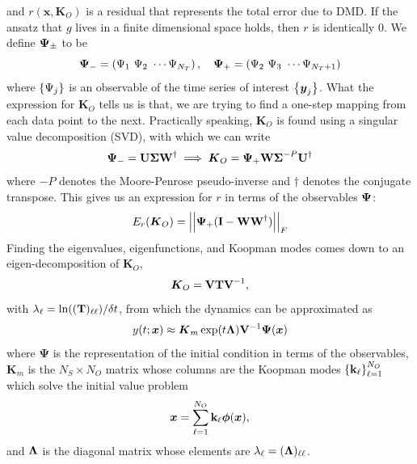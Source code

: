 and $r(\boldsymbol{x}, \boldsymbol{K}_O)$ is a residual that represents the 
total error due to DMD. If the ansatz that $g$ lives in a finite dimensional space holds, 
then $r$ is identically 0. We define ${\bf\Psi}_\pm$ to be
\begin{equation}
    {\bf\Psi}_- = \left(\Psi_1\ \Psi_2\ \cdots \Psi_{N_T}\right),\quad {\bf\Psi}_+ = \left(
    \Psi_2\ \Psi_3\ \cdots \Psi_{N_T+1}\right) 
\end{equation}
where $\left\{\Psi_j\right\}$ is an observable of the time series of interest 
$\left\{\boldsymbol{y}_j\right\}$. What the expression for $\boldsymbol{K}_O$ tells 
us is that, we are trying to find a one-step mapping from each data point
to the next. Practically speaking, $\boldsymbol{K}_O$ is found
using a singular value decomposition (SVD), with which we can write
\begin{equation}
    {\bf\Psi}_- = {\bf U\Sigma W}^{\dagger} \implies \boldsymbol{K}_O = 
    {\bf\Psi}_+{\bf W\Sigma}^{-P}{\bf U}^{\dagger}
\end{equation}
where $-P$ denotes the Moore-Penrose pseudo-inverse and $\dagger$ denotes the 
conjugate transpose. This gives us an expression for $r$ in terms of the 
observables ${\bf\Psi}$:
\begin{equation}
    E_r(\boldsymbol{K}_O) = \left|\left|{\bf\Psi}_+({\bf I} - {\bf WW}^\dagger)\right|\right|_F
\end{equation}
Finding the eigenvalues, eigenfunctions, and Koopman modes comes down to an 
eigen-decomposition of $\boldsymbol{K}_O$,
\begin{equation}
    \boldsymbol{K}_O = {\bf VTV}^{-1}, 
\end{equation}
with $\lambda_\ell = \ln(({\bf T})_{\ell\ell})/\delta t$,
from which the dynamics can be approximated as 
\begin{equation}
    y(t;\boldsymbol{x}) \approx \boldsymbol{K}_m\exp(t{\bf\Lambda}){\bf V}^{-1}\boldsymbol{\Psi}(\boldsymbol{x}) 
\end{equation}
where $\boldsymbol{\Psi}$ is the representation of the initial condition in terms of the observables, 
$\boldsymbol{K}_m$ is the $N_S \times N_O$ matrix whose columns are the Koopman modes 
$\left\{{\bf k}_\ell\right\}_{\ell=1}^{N_O}$ which solve the initial value problem
\begin{equation}
    \boldsymbol{x} = \sum_{\ell=1}^{N_O}{\bf k}_\ell\boldsymbol{\phi}(\boldsymbol{x}),
\end{equation}
and ${\bf \Lambda}$ is the diagonal matrix whose elements are $\lambda_\ell
= ({\bf \Lambda})_{\ell\ell}$.

